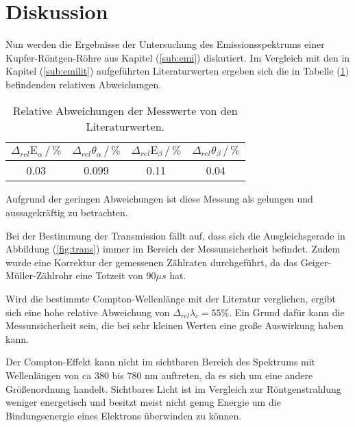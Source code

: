 \newpage
\section{Diskussion}
\label{sec:Diskussion}
\noindent
Nun werden die Ergebnisse der Untersuchung des Emissionsspektrums einer Kupfer-Röntgen-Röhre aus Kapitel (\ref{sub:emi}) diskutiert.
Im Vergleich mit den in Kapitel (\ref{sub:emilit}) aufgeführten Literaturwerten ergeben sich die in Tabelle (\ref{tab:diskemi}) befindenden relativen Abweichungen.

\begin{table}
    \centering
    \caption{Relative Abweichungen der Messwerte von den Literaturwerten.}
    \begin{tabular}{c c c c}
    \toprule
    $\Delta_{rel}\text{E}_\alpha \,/\, \%$ & $\Delta_{rel}\theta_\alpha \,/\, \% $ & $\Delta_{rel}\text{E}_\beta \,/\, \%$ &$\Delta_{rel}\theta_\beta \,/\, \% $\\
    \midrule 
    0.03& 0.099& 0.11& 0.04 \\
    \bottomrule
    \end{tabular}
    \label{tab:diskemi}
    \end{table}

\noindent
Aufgrund der geringen Abweichungen ist diese Messung als gelungen und aussagekräftig zu betrachten.

\noindent
Bei der Bestimmung der Transmission fällt auf, dass sich die Ausgleichsgerade in Abbildung (\ref{fig:trans}) immer im Bereich der Messunsicherheit befindet.
Zudem wurde eine Korrektur der gemessenen Zählraten durchgeführt, da das Geiger-Müller-Zählrohr eine Totzeit von $90 \mu s $ hat.

\noindent
Wird die bestimmte Compton-Wellenlänge mit der Literatur verglichen, 
ergibt sich eine hohe relative Abweichung von $\Delta_{rel} \lambda_c = 55 \% $.
Ein Grund dafür kann die Messunsicherheit sein, die bei sehr kleinen Werten eine große Auswirkung haben kann.

\noindent
Der Compton-Effekt kann nicht im sichtbaren Bereich des Spektrums mit Wellenlängen von ca 380 bis 780 nm auftreten, da es sich um eine andere Größenordnung handelt.
Sichtbares Licht ist im Vergleich zur Röntgenstrahlung weniger energetisch und besitzt meist nicht genug Energie um die Bindungsenergie eines Elektrons überwinden zu können.